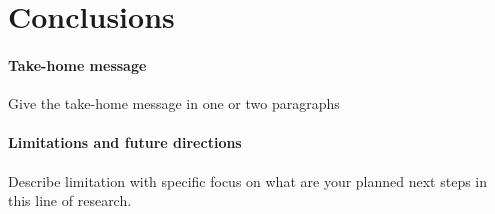 \maketitle
\section{Conclusions}

\paragraph{Take-home message}
	Give the take-home message in one or two paragraphs

\paragraph{Limitations and future directions}
	Describe limitation with specific focus on what are your planned next steps
	in this line of research.
